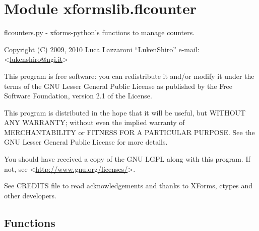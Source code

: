 %
%
%


\section{Module xformslib.flcounter}

    \label{xformslib:flcounter}

flcounters.py - xforms-python's functions to manage counters.

Copyright (C) 2009, 2010  Luca Lazzaroni ``LukenShiro''
e-mail: <\href{mailto:lukenshiro@ngi.it}{lukenshiro@ngi.it}>

This program is free software: you can redistribute it and/or modify
it under the terms of the GNU Lesser General Public License as
published by the Free Software Foundation, version 2.1 of the License.

This program is distributed in the hope that it will be useful,
but WITHOUT ANY WARRANTY; without even the implied warranty of
MERCHANTABILITY or FITNESS FOR A PARTICULAR PURPOSE. See the
GNU Lesser General Public License for more details.

You should have received a copy of the GNU LGPL along with this
program. If not, see <\href{http://www.gnu.org/licenses/}{http://www.gnu.org/licenses/}>.

See CREDITS file to read acknowledgements and thanks to XForms,
ctypes and other developers.


  \subsection{Functions}

    \label{xformslib:flcounter:fl_add_counter}

